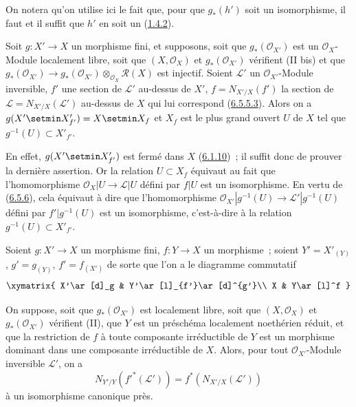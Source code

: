 On notera qu'on utilise ici le fait que, pour que $g_*(h')$ soit un
isomorphisme, il faut et il suffit que $h'$ en soit un
(\hyperref[II.1.4.2-fr]{1.4.2}).

\begin{corollary}[6.5.7]
\label{II.6.5.7-fr}
Soit $g:X'\to X$ un morphisme fini, et supposons, soit que
$g_*(\mathcal{O}_{X'})$ est un $\mathcal{O}_X$-Module localement libre, soit
que $(X,\mathcal{O}_X)$ et $g_*(\mathcal{O}_{X'})$ vérifient \textup{(II bis)}
et que
$g_*(\mathcal{O}_{X'})\to
g_*(\mathcal{O}_{X'})\otimes_{\mathcal{O}_X}\mathcal{R}(X)$ est injectif.
Soient $\mathcal{L}'$ un $\mathcal{O}_{X'}$-Module inversible, $f'$ une
section de $\mathcal{L}'$ au-dessus de $X'$, $f=N_{X'/X}(f')$ la section de
$\mathcal{L}=N_{X'/X}(\mathcal{L}')$ au-dessus de $X$ qui
lui correspond
\textup{(\hyperref[II.6.5.5.3-fr]{6.5.5.3})}.
Alors on a $g(X'\setmin X'_{f'})=X\setmin X_f$ et $X_f$ est le plus grand ouvert $U$ de
$X$ tel que $g^{-1}(U)\subset X'_{f'}$.
\end{corollary}

En effet, $g(X'\setmin X'_{f'})$ est fermé dans $X$
(\hyperref[II.6.1.10-fr]{6.1.10})~; il suffit donc de prouver la dernière
assertion. Or la relation $U\subset X_f$ équivaut au fait que l'homomorphisme
$\mathcal{O}_X|U\to\mathcal{L}|U$ défini par $f|U$ est un isomorphisme. En
vertu de (\hyperref[II.6.5.6-fr]{6.5.6}), cela équivaut à dire que
l'homomorphisme
$\mathcal{O}_{X'}|g^{-1}(U)\to\mathcal{L}'|g^{-1}(U)$ défini par
$f'|g^{-1}(U)$ est un isomorphisme, c'est-à-dire à la relation
$g^{-1}(U)\subset X'_{f'}$.

\begin{proposition}[6.5.8]
\label{II.6.5.8-fr}
Soient $g:X'\to X$ un morphisme fini, $f:Y\to X$ un morphisme~; soient
$Y'=X'_{(Y)}$, $g'=g_{(Y)}$, $f'=f_{(X')}$ de sorte que l'on a le diagramme
commutatif
\[
\xymatrix{
X'\ar[d]_g & Y'\ar[l]_{f'}\ar[d]^{g'}\\
X & Y\ar[l]^f
}
\]

On suppose, soit que $g_*(\mathcal{O}_{X'})$ est localement libre, soit que
$(X,\mathcal{O}_X)$ et $g_*(\mathcal{O}_{X'})$ vérifient \textup{(II)}, que $Y$ est un
préschéma localement noethérien réduit, et que la restriction de $f$ à toute
composante irréductible de $Y$ est un morphisme dominant dans une composante
irréductible de $X$. Alors, pour tout $\mathcal{O}_{X'}$-Module inversible
$\mathcal{L}'$, on a
\[
N_{Y'/Y}({f'}^*(\mathcal{L}'))=f^*(N_{X'/X}(\mathcal{L}'))
\]
à un isomorphisme canonique près.
\end{proposition}

